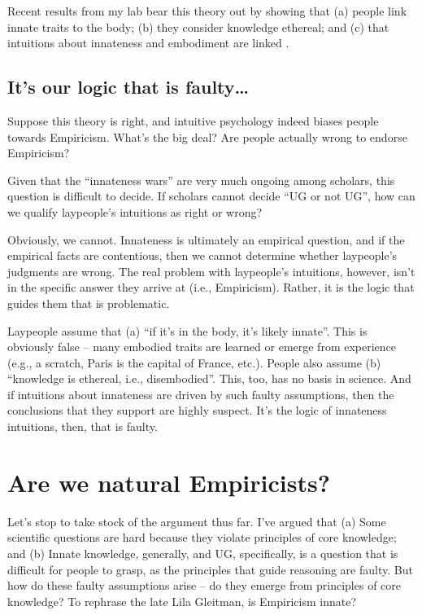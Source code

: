 \documentclass[output=paper,colorlinks,citecolor=brown
]{langscibook}
\begin{document}
Recent results from my lab bear this theory out by showing that (a) people link innate traits to the body; (b) they consider knowledge ethereal; and (c) that intuitions about innateness and embodiment are linked \citep{berent2021can,berent2020essentialist,berent2021empiricism,berent2021essentialist,berent2021public,berent2021true}.

\subsection{It’s our logic that is faulty\ldots}

Suppose this theory is right, and intuitive psychology indeed biases people towards Empiricism. What’s the big deal? Are people actually wrong to endorse Empiricism? 

Given that the ``innateness wars'' are very much ongoing among scholars, this question is difficult to decide. If scholars cannot decide ``UG or not UG'', how can we qualify laypeople’s intuitions as right or wrong?

Obviously, we cannot. Innateness is ultimately an empirical question, and if the empirical facts are contentious, then we cannot determine whether laypeople’s judgments are wrong.  The real problem with laypeople’s intuitions, however, isn’t in the specific answer they arrive at (i.e., Empiricism). Rather, it is the logic that guides them that is problematic. 

Laypeople assume that (a) ``if it’s in the body, it’s likely innate''. This is obviously false -- many embodied traits are learned or emerge from experience (e.g., a scratch, Paris is the capital of France, etc.). People also assume (b) ``knowledge is ethereal, i.e., disembodied''. This, too, has no basis in science. And if intuitions about innateness are driven by such faulty assumptions, then the conclusions that they support are highly suspect. It’s the logic of innateness intuitions, then, that is faulty.

\section{Are we natural Empiricists?}\label{berent-section-4}\largerpage

Let’s stop to take stock of the argument thus far. I’ve argued that (a) Some scientific questions are hard because they violate principles of core knowledge; and (b) Innate knowledge, generally, and UG, specifically, is a question that is difficult for people to grasp, as the principles that guide reasoning are faulty. But how do these faulty assumptions arise -- do they emerge from principles of core knowledge? To rephrase the late Lila Gleitman, is Empiricism innate?
\end{document}
